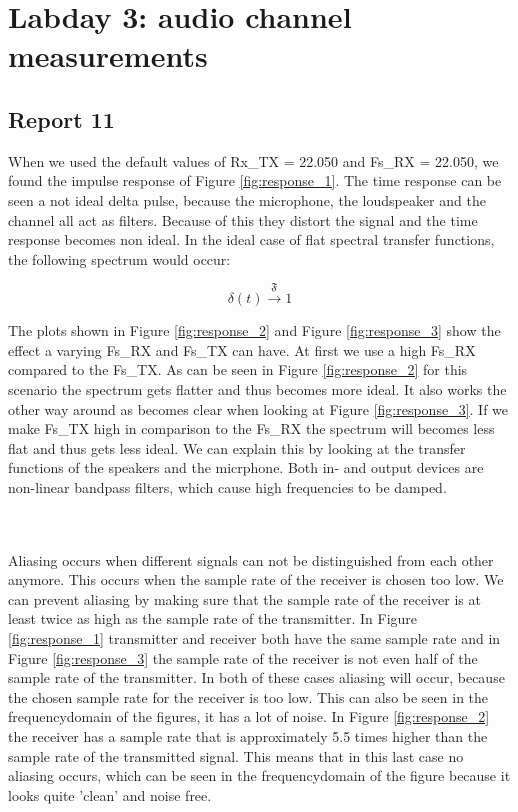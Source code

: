 \documentclass[final]{scrreprt} %
\begin{document}
\chapter{Labday 3: audio channel measurements}
\label{ch:labday3}
\section{Report 11}
When we used the default values of Rx\_TX = 22.050 and Fs\_RX = 22.050, we found the impulse response of Figure \ref{fig:response_1}.
The time response can be seen a not ideal delta pulse, because the microphone, the loudspeaker and the channel all act as filters. 
Because of this they distort the signal and the time response becomes non ideal.
In the ideal case of flat spectral transfer functions, the following spectrum would occur:

\begin{equation}
	\delta(t) \xrightarrow{\mathfrak{F}} 1
\end{equation}

The plots shown in Figure \ref{fig:response_2} and Figure \ref{fig:response_3} show the effect a varying Fs\_RX and Fs\_TX can have.
At first we use a high Fs\_RX compared to the Fs\_TX. 
As can be seen in Figure \ref{fig:response_2} for this scenario the spectrum gets flatter and thus becomes more ideal. 
It also works the other way around as becomes clear when looking at Figure \ref{fig:response_3}. 
If we make Fs\_TX high in comparison to the Fs\_RX the spectrum will becomes less flat and thus gets less ideal.
We can explain this by looking at the transfer functions of the speakers and the micrphone. 
Both in- and output devices are non-linear bandpass filters, which cause high frequencies to be damped. 

\\ \\
Aliasing occurs when different signals can not be distinguished from each other anymore.
This occurs when the sample rate of the receiver is chosen too low.
We can prevent aliasing by making sure that the sample rate of the receiver is at least twice as high as the sample rate of the transmitter.
In Figure \ref{fig:response_1} transmitter and receiver both have the same sample rate and in Figure \ref{fig:response_3} the sample rate of the receiver is not even half of the sample rate of the transmitter. 
In both of these cases aliasing will occur, because the chosen sample rate for the receiver is too low. 
This can also be seen in the frequencydomain of the figures, it has a lot of noise. 
In Figure \ref{fig:response_2} the receiver has a sample rate that is approximately 5.5 times higher than the sample rate of the transmitted signal.
This means that in this last case no aliasing occurs, which can be seen in the frequencydomain of the figure because it looks quite 'clean' and noise free.\\
\end{document}
